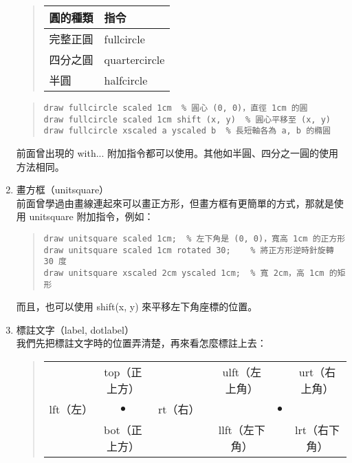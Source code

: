 \begin{enumerate}
        \begin{quote}
          \begin{tabular}{l>{\ttfamily }l}
            圓的種類 & 指令          \\
            \hline
            完整正圓 & fullcircle    \\
            四分之圓 & quartercircle \\
            半圓     & halfcircle
          \end{tabular}
        \end{quote}

        \begin{quote}
          \begin{verbatim}
draw fullcircle scaled 1cm  % 圓心 (0, 0)，直徑 1cm 的圓
draw fullcircle scaled 1cm shift (x, y)  % 圓心平移至 (x, y)
draw fullcircle xscaled a yscaled b  % 長短軸各為 a, b 的橢圓
\end{verbatim}
        \end{quote}

        前面曾出現的 {\ttfamily with...} 附加指令都可以使用。其他如半圓、四分之一圓的使用方法相同。

  \item 畫方框（unitsquare）\\
        前面曾學過由畫線連起來可以畫正方形，但畫方框有更簡單的方式，那就是使用 {\ttfamily unitsquare} 附加指令，例如：

        \begin{quote}
          \begin{verbatim}
draw unitsquare scaled 1cm;  % 左下角是 (0, 0)，寬高 1cm 的正方形
draw unitsquare scaled 1cm rotated 30;    % 將正方形逆時針旋轉 30 度
draw unitsquare xscaled 2cm yscaled 1cm;  % 寬 2cm，高 1cm 的矩形
\end{verbatim}
        \end{quote}

        而且，也可以使用 {\ttfamily shift(x, y)} 來平移左下角座標的位置。

  \item 標註文字（label, dotlabel）\\
        我們先把標註文字時的位置弄清楚，再來看怎麼標註上去：

        \begin{quote}
          \tabcolsep=1pt
          \begin{tabular}{ccccccc}
                      & top（正上方） &          &  & ulft（左上角） &           & urt（右上角） \\
            lft（左） & $\bullet$     & rt（右） &  &                & $\bullet$ &               \\
                      & bot（正上方） &          &  & llft（左下角） &           & lrt（右下角）
          \end{tabular}
        \end{quote}


\end{enumerate}
